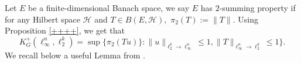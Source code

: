 \documentclass[a4paper,oneside,11pt, reqno]{amsart}
\numberwithin{equation}{section}
\theoremstyle{plain}
\begin{document}
Let $E$ be a finite-dimensional Banach space, we say $E$ has $2$-summing property if for any Hilbert space $\mathcal{H}$ and $T\in B(E,\mathcal{H}),$ $\pi_2(T):=\|T\|$.  
Using Proposition \ref{++++}, we get that  \begin{equation}\label{kgpi}K_G^+(\ell_\infty^n,\ell_2^k)=\sup\{\pi_2(Tu)\}:\|u\|_{\ell_2^k\to\ell_\infty^n}\leqslant 1,\|T\|_{\ell_\infty^n\to{\ell_2^k}}\leqslant 1\}.\end{equation} 
We recall below a useful Lemma from \cite{Rietz}.
\end{document}
